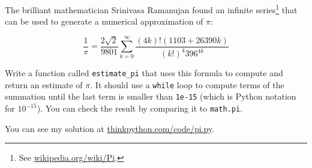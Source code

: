 \begin{exercise}


The brilliant mathematician Srinivasa Ramanujan found an
infinite series\footnote{See \url{wikipedia.org/wiki/Pi}.}
that can be used to generate a numerical
approximation of $\pi$:

\begin{equation}
\frac{1}{\pi} = \frac{2\sqrt{2}}{9801} 
\sum^\infty_{k=0} \frac{(4k)!(1103+26390k)}{(k!)^4 396^{4k}} 
\label{eq:pi}
\end{equation}


Write a function called \verb"estimate_pi" that uses this formula
to compute and return an estimate of $\pi$.  It should use a {\tt while}
loop to compute terms of the summation until the last term is
smaller than {\tt 1e-15} (which is Python notation for $10^{-15}$).
You can check the result by comparing it to {\tt math.pi}.

{\color{red} You can see my solution at \url{thinkpython.com/code/pi.py}.}
\end{exercise}
